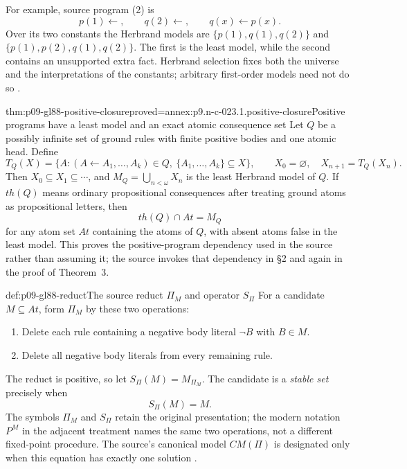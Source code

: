 For example, source program (2) is
\[
 p(1)\leftarrow,\qquad q(2)\leftarrow,\qquad q(x)\leftarrow p(x).
\]
Over its two constants the Herbrand models are
\(\{p(1),q(1),q(2)\}\) and
\(\{p(1),p(2),q(1),q(2)\}\).  The first is the least model, while the
second contains an unsupported extra fact.  Herbrand selection fixes both
the universe and the interpretations of the constants; arbitrary first-order
models need not do so \cite[\S1, pp.~1--2]{GelfondLifschitz1988}.

\begin{hblemma}{thm:p09-gl88-positive-closure}{proved=annex:p9.n-c-023.1.positive-closure}{Positive programs have a least model and an exact atomic consequence set}
Let \(Q\) be a possibly infinite set of ground rules with finite positive
bodies and one atomic head.  Define
\[
 T_Q(X)=\{A:(A\leftarrow A_1,\ldots,A_k)\in Q,
                    \ \{A_1,\ldots,A_k\}\subseteq X\},
 \qquad X_0=\varnothing,\quad X_{n+1}=T_Q(X_n).
\]
Then \(X_0\subseteq X_1\subseteq\cdots\), and
\(M_Q=\bigcup_{n<\omega}X_n\) is the least Herbrand model of \(Q\).
If \(th(Q)\) means ordinary propositional consequences after treating ground
atoms as propositional letters, then
\[
 th(Q)\cap At=M_Q
\]
for any atom set \(At\) containing the atoms of \(Q\), with absent atoms
false in the least model.  This proves the positive-program dependency used
in the source rather than assuming it; the source invokes that dependency in
\S2 and again in the proof of Theorem~3.
\end{hblemma}

\begin{hbdefinition}{def:p09-gl88-reduct}{The source reduct \(\Pi_M\) and operator \(S_\Pi\)}
For a candidate \(M\subseteq At\), form \(\Pi_M\) by these two operations:
\begin{enumerate}
\item Delete each rule containing a negative body literal \(\neg B\) with
  \(B\in M\).
\item Delete all negative body literals from every remaining rule.
\end{enumerate}
The reduct is positive, so let \(S_\Pi(M)=M_{\Pi_M}\).  The candidate is
a \emph{stable set} precisely when
\[
 S_\Pi(M)=M.
\]
The symbols \(\Pi_M\) and \(S_\Pi\) retain the original presentation;
the modern notation \(P^M\) in the adjacent treatment names the same two
operations, not a different fixed-point procedure.  The source's canonical
model \(CM(\Pi)\) is designated only when this equation has exactly one
solution \cite[\S2, p.~4]{GelfondLifschitz1988}.
\end{hbdefinition}

